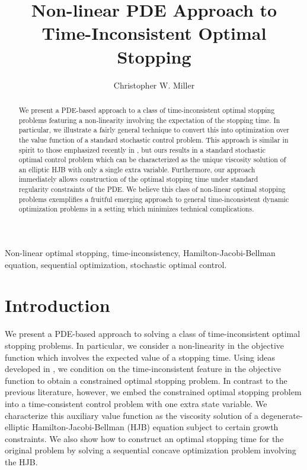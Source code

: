 \documentclass[11pt]{article}
\title{Non-linear PDE Approach to Time-Inconsistent Optimal Stopping}
\author{Christopher W. Miller\footnotemark[1]}
\begin{document}
\maketitle


\begin{abstract}
We present a PDE-based approach to a class of time-inconsistent optimal stopping problems featuring a non-linearity involving the expectation of the stopping time. In particular, we illustrate a fairly general technique to convert this into optimization over the value function of a standard stochastic control problem. This approach is similar in spirit to those emphasized recently in \cite{PedersenPeskir2013,Karnam2015}, but ours results in a standard stochastic optimal control problem which can be characterized as the unique viscosity solution of an elliptic HJB with only a single extra variable. Furthermore, our approach immediately allows construction of the optimal stopping time under standard regularity constraints of the PDE. We believe this class of non-linear optimal stopping problems exemplifies a fruitful emerging approach to general time-inconsistent dynamic optimization problems in a setting which minimizes technical complications.
\end{abstract}

\begin{keywords}Non-linear optimal stopping, time-inconsistency, Hamilton-Jacobi-Bellman equation, sequential optimization, stochastic optimal control.\end{keywords}

\section{Introduction}\label{Section:Introduction}

We present a PDE-based approach to solving a class of time-inconsistent optimal stopping problems. In particular, we consider a non-linearity in the objective function which involves the expected value of a stopping time. Using ideas developed in \cite{PedersenPeskir2013}, we condition on the time-inconsistent feature in the objective function to obtain a constrained optimal stopping problem. In contrast to the previous literature, however, we embed the constrained optimal stopping problem into a time-consistent control problem with one extra state variable. We characterize this auxiliary value function as the viscosity solution of a degenerate-elliptic Hamilton-Jacobi-Bellman (HJB) equation subject to certain growth constraints. We also show how to construct an optimal stopping time for the original problem by solving a sequential concave optimization problem involving the HJB.
\end{document}

